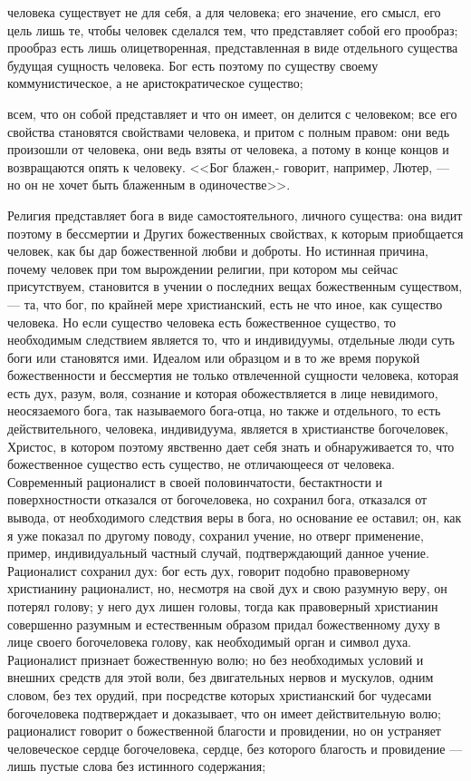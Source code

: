 \documentclass[12pt]{article}
\begin{document}
человека существует не для себя, а для человека; его значение, его смысл, его цель лишь те, чтобы человек сделался тем, что представляет собой его прообраз; прообраз есть лишь олицетворенная, представленная в виде отдельного существа будущая сущность человека. Бог есть поэтому по существу своему коммунистическое, а не аристократическое существо; 

всем, что он собой представляет и что он имеет, он делится с человеком; все его свойства становятся свойствами человека, и притом с полным правом: они ведь произошли от человека, они ведь взяты от человека, а потому в конце концов и возвращаются опять к человеку. <<Бог блажен,- говорит, например, Лютер, --- но он не хочет быть блаженным в одиночестве>>. 

Религия представляет бога в виде самостоятельного, личного существа: она видит поэтому в бессмертии и Других божественных свойствах, к которым приобщается человек, как бы дар божественной любви и доброты. Но истинная причина, почему человек при том вырождении религии, при котором мы сейчас присутствуем, становится в учении о последних вещах божественным существом, --- та, что бог, по крайней мере христианский, есть не что иное, как существо человека. Но если существо человека есть божественное существо, то необходимым следствием является то, что и индивидуумы, отдельные люди суть боги или становятся ими. Идеалом или образцом и в то же время порукой божественности и бессмертия не только отвлеченной сущности человека, которая есть дух, разум, воля, сознание и которая обожествляется в лице невидимого, неосязаемого бога, так называемого бога-отца, но также и отдельного, то есть действительного, человека, индивидуума, является в христианстве богочеловек, Христос, в котором поэтому явственно дает себя знать и обнаруживается то, что божественное существо есть существо, не отличающееся от человека. Современный рационалист в своей половинчатости, бестактности и поверхностности отказался от богочеловека, но сохранил бога, отказался от вывода, от необходимого следствия веры в бога, но основание ее оставил; он, как я уже показал по другому поводу, сохранил учение, но отверг применение, пример, индивидуальный частный случай, подтверждающий данное учение. Рационалист сохранил дух: бог есть дух, говорит подобно правоверному христианину рационалист, но, несмотря на свой дух и свою разумную веру, он потерял голову; у него дух лишен головы, тогда как правоверный христианин совершенно разумным и естественным образом придал божественному духу в лице своего богочеловека голову, как необходимый орган и символ духа. Рационалист признает божественную волю; но без необходимых условий и внешних средств для этой воли, без двигательных нервов и мускулов, одним словом, без тех орудий, при посредстве которых христианский бог чудесами богочеловека подтверждает и доказывает, что он имеет действительную волю; рационалист говорит о божественной благости и провидении, но он устраняет человеческое сердце богочеловека, сердце, без которого благость и провидение --- лишь пустые слова без истинного содержания; 
\end{document}
